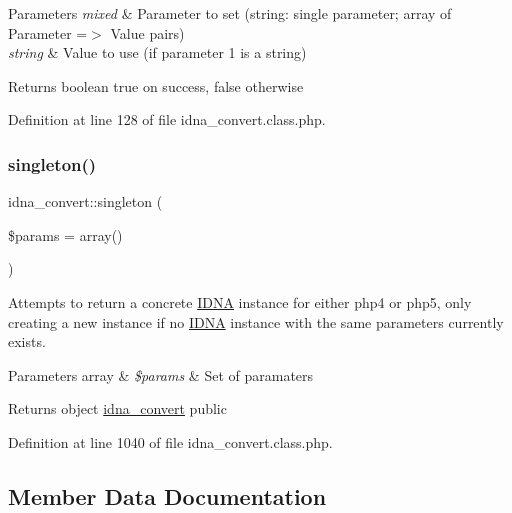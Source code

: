 \begin{DoxyParams}{Parameters}
{\em mixed} & Parameter to set (string\+: single parameter; array of Parameter =$>$ Value pairs) \\
\hline
{\em string} & Value to use (if parameter 1 is a string) \\
\hline
\end{DoxyParams}
\begin{DoxyReturn}{Returns}
boolean true on success, false otherwise 
\end{DoxyReturn}


Definition at line 128 of file idna\+\_\+convert.\+class.\+php.

\hypertarget{classidna__convert_a899f287645e43d1fd44a627cdb6b0e79}{}\label{classidna__convert_a899f287645e43d1fd44a627cdb6b0e79} 
\subsubsection{\texorpdfstring{singleton()}{singleton()}}
{\footnotesize\ttfamily idna\+\_\+convert\+::singleton (\begin{DoxyParamCaption}\item[{}]{\$params = {\ttfamily array()} }\end{DoxyParamCaption})}

Attempts to return a concrete \hyperlink{namespaceIDNA}{I\+D\+NA} instance for either php4 or php5, only creating a new instance if no \hyperlink{namespaceIDNA}{I\+D\+NA} instance with the same parameters currently exists.


\begin{DoxyParams}[1]{Parameters}
array & {\em \$params} & Set of paramaters\\
\hline
\end{DoxyParams}
\begin{DoxyReturn}{Returns}
object \hyperlink{classidna__convert}{idna\+\_\+convert}  public 
\end{DoxyReturn}


Definition at line 1040 of file idna\+\_\+convert.\+class.\+php.



\subsection{Member Data Documentation}
\hypertarget{classidna__convert_a7a40288feb2a5635c567a28710017e56}{}\label{classidna__convert_a7a40288feb2a5635c567a28710017e56} 
